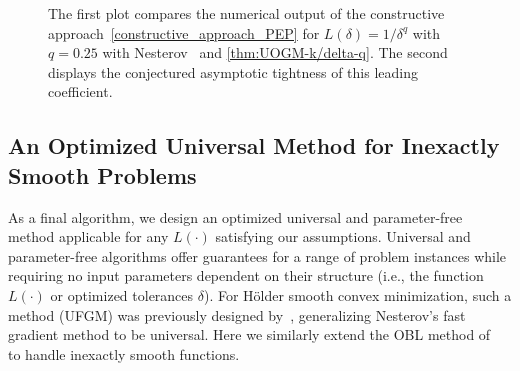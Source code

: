 \documentclass[11pt, hidelinks]{article}
\numberwithin{equation}{section}
\theoremstyle{thmstyletwo}%
\numberwithin{equation}{section}
\newcommand{\Holder}{H\"older }
\begin{document}
\begin{figure}[htbp]
\begin{subfigure}[b]{0.48\textwidth}
\end{subfigure}
 \caption{The first plot compares the numerical output of the constructive approach~\eqref{constructive_approach_PEP} for $L(\delta) = 1/\delta^q$ with $q = 0.25$ with Nesterov~\cite[Theorem 3]{Nesterov_2014} and \cref{thm:UOGM-k/delta-q}. The second displays the conjectured asymptotic tightness of this leading coefficient.}\label{fig:Holder-optimized-plots}
\end{figure}





\subsection{An Optimized Universal Method for Inexactly Smooth Problems}\label{subsec:OBL}

As a final algorithm, we design an optimized universal and parameter-free method applicable for any $L(\cdot)$ satisfying our assumptions. Universal and parameter-free algorithms offer guarantees for a range of problem instances while requiring no input parameters dependent on their structure (i.e., the function $L(\cdot)$ or optimized tolerances $\delta$). For \Holder smooth convex minimization, such a method (UFGM) was previously designed by~\cite{Nesterov_2014}, generalizing Nesterov's fast gradient method to be universal. Here we similarly extend the OBL method of~\cite{OBL} to handle inexactly smooth functions.  
\end{document}
